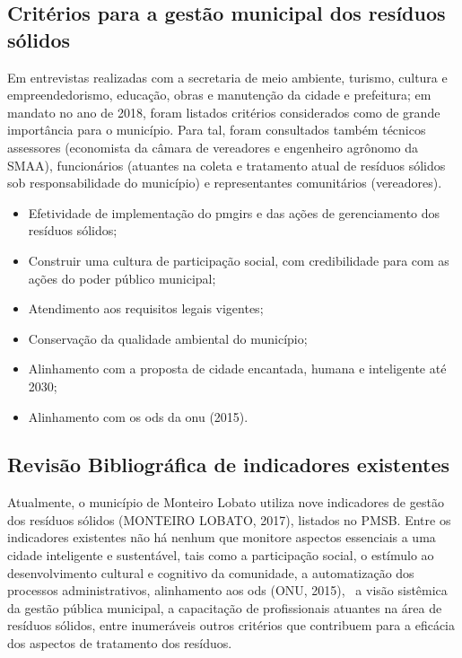 \subsection{Critérios para a gestão municipal dos resíduos sólidos}

Em entrevistas realizadas com a secretaria de meio ambiente, turismo, cultura e empreendedorismo, educação, obras e manutenção da cidade e prefeitura; em mandato no ano de 2018, foram listados critérios considerados como de grande importância para o município. Para tal, foram consultados também técnicos assessores (economista da câmara de vereadores e engenheiro agrônomo da SMAA), funcionários (atuantes na coleta e tratamento atual de resíduos sólidos sob responsabilidade do município) e representantes comunitários (vereadores).

\begin{itemize}
	\item Efetividade de implementação do \gls{pmgirs} e das ações de gerenciamento dos resíduos sólidos;
	\item Construir uma cultura de participação social, com credibilidade para com as ações do poder público municipal;
	\item Atendimento aos requisitos legais vigentes;
	\item Conservação da qualidade ambiental do município;
	\item Alinhamento com a proposta de cidade encantada, humana e inteligente até 2030;
	\item Alinhamento com os \gls{ods} da \gls{onu} (2015).
\end{itemize}

\subsection{Revisão Bibliográfica de indicadores existentes }

Atualmente, o município de Monteiro Lobato utiliza nove indicadores de gestão dos resíduos sólidos (MONTEIRO LOBATO, 2017), listados no PMSB.
Entre os indicadores existentes não há nenhum que monitore aspectos essenciais a uma cidade inteligente e sustentável, tais como a participação social, o estímulo ao desenvolvimento cultural e cognitivo da comunidade, a automatização dos processos administrativos, alinhamento aos \gls{ods} (ONU, 2015),  a visão sistêmica da gestão pública municipal, a capacitação de profissionais atuantes na área de resíduos sólidos, entre inumeráveis outros critérios que contribuem para a eficácia dos aspectos de tratamento dos resíduos.


